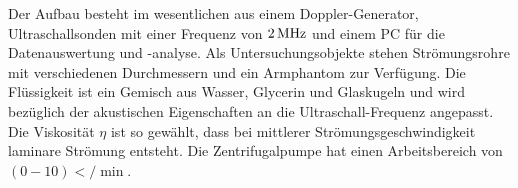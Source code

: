 Der Aufbau besteht im wesentlichen aus einem Doppler-Generator,
Ultraschallsonden mit einer Frequenz von $2\,\si{\mega\hertz}$ und einem PC für die Datenauswertung
und -analyse. Als Untersuchungsobjekte stehen Strömungsrohre mit verschiedenen
Durchmessern und ein Armphantom zur Verfügung. Die Flüssigkeit ist ein Gemisch
aus Wasser, Glycerin und Glaskugeln und wird bezüglich der akustischen
Eigenschaften an die Ultraschall-Frequenz angepasst. Die Viskosität $\eta$ ist so
gewählt, dass bei mittlerer Strömungsgeschwindigkeit laminare Strömung
entsteht.
Die Zentrifugalpumpe hat einen Arbeitsbereich von $(0-10)\lt/\min$.
